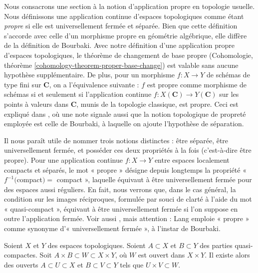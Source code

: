 \noindent
Nous consacrons une section à la notion d'application propre en topologie
usuelle. Nous définissons une application continue d'espaces topologiques
comme étant {\it propre} si elle est universellement fermée et séparée.
Bien que cette définition s'accorde avec celle d'un morphisme propre en
géométrie algébrique, elle diffère de la définition de Bourbaki.
Avec notre définition d'une application propre d'espaces topologiques, le
théorème de changement de base propre (Cohomologie,
théorème \ref{cohomology-theorem-proper-base-change}) est valable sans aucune
hypothèse supplémentaire. De plus, pour un morphisme $f : X \to Y$ de schémas
de type fini sur $\mathbf{C}$, on a l'équivalence suivante : $f$ est propre
comme morphisme de schémas si et seulement si l'application continue
$f : X(\mathbf{C}) \to Y(\mathbf{C})$ sur les points à valeurs dans
$\mathbf{C}$, munis de la topologie classique, est propre.
Ceci est expliqué dans \cite[Exp. XII, Prop.\ 3.2(v)]{SGA1}, où une note
signale aussi que la notion topologique de propreté employée est celle de
Bourbaki, à laquelle on ajoute l'hypothèse de séparation.

\medskip\noindent
Il nous paraît utile de nommer trois notions distinctes : être séparée, être
universellement fermée, et posséder ces deux propriétés à la fois
(c'est-à-dire être propre). Pour une application continue $f : X \to Y$
entre espaces localement compacts et séparés, le mot « propre » désigne depuis
longtemps la propriété « $f^{-1}($compact$) =$ compact », laquelle équivaut à
être universellement fermée pour des espaces aussi réguliers.
En fait, nous verrons que, dans le cas général, la condition sur les images
réciproques, formulée par souci de clarté à l'aide du mot « quasi-compact »,
équivaut à être universellement fermée si l'on suppose en outre l'application
fermée. Voir aussi \cite[exercices 22 à 26 du chapitre II]{LangReal}, mais
attention : Lang emploie « propre » comme synonyme d'« universellement
fermée », à l'instar de Bourbaki.

\begin{lemma}
\label{lemma-tube}
Soient $X$ et $Y$ des espaces topologiques.
Soient $A \subset X$ et $B \subset Y$ des parties quasi-compactes.
Soit $A \times B \subset W \subset X \times Y$, où $W$ est ouvert dans
$X \times Y$. Il existe alors des ouverts $A \subset U \subset X$ et
$B \subset V \subset Y$ tels que $U \times V \subset W$.
\end{lemma}

